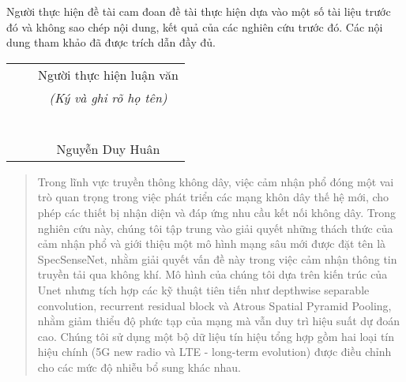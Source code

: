 \documentclass[a4paper, oneside]{book}
\begin{document}
\begin{declaration}
	Người thực hiện đề tài cam đoan đề tài thực hiện dựa vào một số tài liệu trước đó và không sao chép nội dung, kết quả của các nghiên cứu trước đó. Các nội dung tham khảo đã được trích dẫn đầy đủ.
 \\
\begin{table}[!h]
\centering
\begin{tabular}{p{3cm} p{3cm} p{3cm} p{3cm}}
&  & \multicolumn{2}{c}{Người thực hiện luận văn} \\
&  & \multicolumn{2}{c}{\textit{(Ký và ghi rõ họ tên)}} \\
&  &             &            \\
&  &             &            \\
&  &             &            \\
&  &             &            \\
&  &             &            \\
&  &             &            \\
&  & \multicolumn{2}{c}{Nguyễn Duy Huân}    
\end{tabular}
\end{table}
\end{declaration}

\begin{abstract}
     \noindent Trong lĩnh vực truyền thông không dây, việc cảm nhận phổ đóng một vai trò quan trọng trong việc phát triển các mạng khôn dây thế hệ mới, cho phép các thiết bị nhận diện và đáp ứng nhu cầu kết nối không dây. Trong nghiên cứu này, chúng tôi tập trung vào giải quyết những thách thức của cảm nhận phổ và giới thiệu một mô hình mạng sâu mới được đặt tên là SpecSenseNet, nhằm giải quyết vấn đề này trong việc cảm nhận thông tin truyền tải qua không khí. Mô hình của chúng tôi dựa trên kiến trúc của Unet nhưng tích hợp các kỹ thuật tiên tiến như depthwise separable convolution, recurrent residual block và Atrous Spatial Pyramid Pooling, nhằm giảm thiểu độ phức tạp của mạng mà vẫn duy trì hiệu suất dự đoán cao. Chúng tôi sử dụng một bộ dữ liệu tín hiệu tổng hợp gồm hai loại tín hiệu chính (5G new radio và LTE - long-term evolution) được điều chỉnh cho các mức độ nhiễu bổ sung khác nhau. 
 
\end{abstract}	
\end{document}

